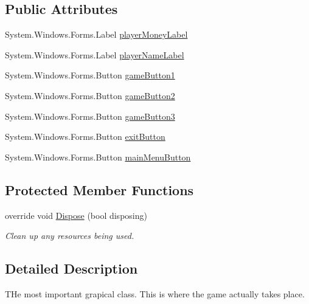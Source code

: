 \subsection*{Public Attributes}
\begin{DoxyCompactItemize}
\item 
System.\+Windows.\+Forms.\+Label \mbox{\hyperlink{class_monopoly_1_1_main_1_1_monopoly_a3b1deb7d01727b0fa93bde36ceb67e6e}{player\+Money\+Label}}
\item 
System.\+Windows.\+Forms.\+Label \mbox{\hyperlink{class_monopoly_1_1_main_1_1_monopoly_a30d2b83cde1a1d43628ac9f7eb98480d}{player\+Name\+Label}}
\item 
System.\+Windows.\+Forms.\+Button \mbox{\hyperlink{class_monopoly_1_1_main_1_1_monopoly_a75f8e6a4ec6421cd8634abd1be9aeaf5}{game\+Button1}}
\item 
System.\+Windows.\+Forms.\+Button \mbox{\hyperlink{class_monopoly_1_1_main_1_1_monopoly_a6dd95fe76b7871d46f1f2fc50827d57a}{game\+Button2}}
\item 
System.\+Windows.\+Forms.\+Button \mbox{\hyperlink{class_monopoly_1_1_main_1_1_monopoly_a3ebf1ea08532109862bd7a42d8bba82d}{game\+Button3}}
\item 
System.\+Windows.\+Forms.\+Button \mbox{\hyperlink{class_monopoly_1_1_main_1_1_monopoly_aebc7fa25ca336916a789353042c64d3d}{exit\+Button}}
\item 
System.\+Windows.\+Forms.\+Button \mbox{\hyperlink{class_monopoly_1_1_main_1_1_monopoly_a74342d821d26d9db2c7a6e24e3b90f1a}{main\+Menu\+Button}}
\end{DoxyCompactItemize}
\subsection*{Protected Member Functions}
\begin{DoxyCompactItemize}
\item 
override void \mbox{\hyperlink{class_monopoly_1_1_main_1_1_monopoly_ad72d470eef7bdabd812725e098e7b77f}{Dispose}} (bool disposing)
\begin{DoxyCompactList}\small\item\em Clean up any resources being used. \end{DoxyCompactList}\end{DoxyCompactItemize}


\subsection{Detailed Description}
T\+He most important grapical class. This is where the game actually takes place. 

